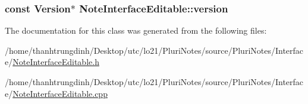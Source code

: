 \subsubsection[{\texorpdfstring{version}{version}}]{\setlength{\rightskip}{0pt plus 5cm}const {\bf Version}$\ast$ Note\+Interface\+Editable\+::version\hspace{0.3cm}{\ttfamily [protected]}}\hypertarget{classNoteInterfaceEditable_a675dc96abf62ead999fa4b62a0fed1e9}{}\label{classNoteInterfaceEditable_a675dc96abf62ead999fa4b62a0fed1e9}


The documentation for this class was generated from the following files\+:\begin{DoxyCompactItemize}
\item 
/home/thanhtrungdinh/\+Desktop/utc/lo21/\+Pluri\+Notes/source/\+Pluri\+Notes/\+Interface/\hyperlink{NoteInterfaceEditable_8h}{Note\+Interface\+Editable.\+h}\item 
/home/thanhtrungdinh/\+Desktop/utc/lo21/\+Pluri\+Notes/source/\+Pluri\+Notes/\+Interface/\hyperlink{NoteInterfaceEditable_8cpp}{Note\+Interface\+Editable.\+cpp}\end{DoxyCompactItemize}
